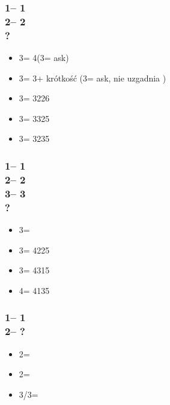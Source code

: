 \documentclass[12pt, a4paper]{report}
\begin{document}
{    \subsubsection*{1\clubs -- 1\spades\\
                    2\spades -- 2\nt\\
                    ?}
    \begin{itemize}
        \item 3\clubs = 4\spades (3\diams = ask)
        \item 3\diams = 3\spades + krótkość (3\hearts = ask, nie uzgadnia \spades)
        \item 3\hearts = 3226
        \item 3\spades = 3325
        \item 3\nt = 3235
    \end{itemize}

    \subsubsection*{1\clubs -- 1\spades\\
                    2\spades -- 2\nt\\
                    3\clubs -- 3\diams\\
                    ?}
    \begin{itemize}
        \item 3\hearts = \bal
        \item 3\spades = 4225
        \item 3\nt = 4315
        \item 4\clubs = 4135
    \end{itemize}

    \subsubsection*{1\diams -- 1\hearts\\
                    2\hearts -- ?}
    \begin{itemize}
        \item 2\spades = \gf
        \item 2\nt = \inv\ \spades
        \item 3\minor/3\hearts = \inv
    \end{itemize}

}
\end{document}
